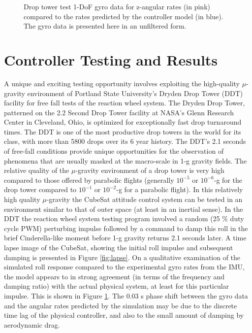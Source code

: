 \documentclass[]{aiaa-tc}%
\begin{document}
\begin{figure}[!ht]
 \centering
 {\footnotesize }
 \caption{Drop tower test 1-DoF gyro data for z-angular rates (in pink) compared to the rates predicted by the controller model (in blue). The gyro data is presented here in an unfiltered form.}
 \label{fig:drop_results}
\end{figure}

\section{Controller Testing and Results}
A unique and exciting testing opportunity involves exploiting the high-quality $\mu$-gravity environment of Portland State University's Dryden Drop Tower (DDT) facility for free fall tests of the reaction wheel system. The Dryden Drop Tower, patterned on the 2.2 Second Drop Tower facility at NASA's Glenn Research Center in Cleveland, Ohio, is optimized for exceptionally fast drop turnaround times. The DDT is one of the most productive drop towers in the world for its class, with more than 5800 drops over its 6 year history. 
The DDT's 2.1 seconds of free-fall conditions provide unique opportunities for the observation of phenomena that are usually masked at the macro-scale in 1-g gravity fields. The relative quality of the $\mu$-gravity environment of a drop tower is very high compared to those offered by parabolic flights (generally $10^{-5}$ or $10^{-6}$-g for the drop tower compared to $10^{-1}$ or $10^{-2}$-g for a parabolic flight). In this relatively high quality $\mu$-gravity the CubeSat attitude control system can be tested in an environment similar to that of outer space (at least in an inertial sense). In the DDT the reaction wheel system testing program involved a random (25 \% duty cycle PWM) perturbing impulse followed by a command to damp this roll in the brief Cinderella-like moment before 1-g gravity returns 2.1 seconds later. A time lapse image of the CubeSat, showing the initial roll impulse and subsequent damping is presented in Figure \ref{fig:lapse}. On a qualitative examination of the simulated roll response compared to the experimental gyro rates from the IMU, the model appears to in strong agreement (in terms of the frequency and damping ratio) with the actual physical system, at least for this particular impulse. This is shown in Figure \ref{fig:drop_results}. The 0.03 s phase shift between the gyro data and the angular rates predicted by the simulation may be due to the discrete time lag of the physical controller, and also to the small amount of damping by aerodynamic drag.  
\end{document}
